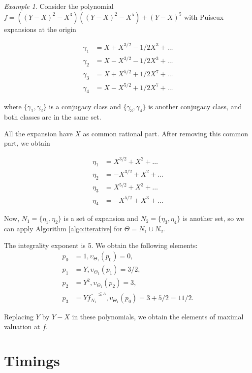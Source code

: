 \documentclass[a4paper,11pt]{amsart}%
\theoremstyle{definition}
\theoremstyle{plain}
\theoremstyle{remark}
\newtheorem{example}[defn]{Example}
\begin{document}
\begin{example}
Consider the polynomial $f=((Y-X)^2-X^3)((Y-X)^2-X^5)+(Y-X)^5$ with Puiseux expansions at the origin
\begin{multicols}{2}\noindent
\begin{align*}
\gamma_1 &= X + X^{3/2} - 1/2 X^3 + \dots \\
\gamma_2 &= X - X^{3/2} - 1/2 X^3 + \dots \\
\gamma_3 &= X + X^{5/2} + 1/2 X^7 + \dots \\
\gamma_4 &= X - X^{5/2} + 1/2 X^7 + \dots
\end{align*}
\end{multicols}
\noindent where $\{\gamma_1, \gamma_2\}$ is a conjugacy class and $\{\gamma_3, \gamma_4\}$ is another conjugacy class, and both classes are in the same set.

All the expansion have $X$ as common rational part. After removing this common part, we obtain
\begin{multicols}{2}\noindent
\begin{align*}
\eta_1 &= X^{3/2} + X^2 + \dots \\
\eta_2 &= -X^{3/2} + X^2 + \dots \\
\eta_3 &= X^{5/2} + X^3 + \dots \\
\eta_4 &= -X^{5/2} + X^3 + \dots
\end{align*}
\end{multicols}

Now, $N_1 = \{\eta_1, \eta_2\}$ is a set of expansion and $N_2 = \{\eta_3, \eta_4\}$ is another set, so we can apply Algorithm \ref{algo:iterative} for $\Theta = N_1 \cup N_2$.

The integrality exponent is 5. We obtain the following elements:
\begin{align*}
p_0 &= 1, \upsilon_{\Theta_1}(p_0) = 0, \\
p_1 &= Y, \upsilon_{\Theta_1}(p_1) = 3/2, \\
p_2 &= Y^2, \upsilon_{\Theta_1}(p_2) = 3, \\
p_3 &= Y \overline{f_{N_1}}^{\le 5}, \upsilon_{\Theta_1}(p_0) = 3 + 5/2 = 11/2.
\end{align*}

Replacing $Y$ by $Y - X$ in these polynomials, we obtain the elements of maximal valuation at $f$.
\end{example}


\section{Timings}
\end{document}
